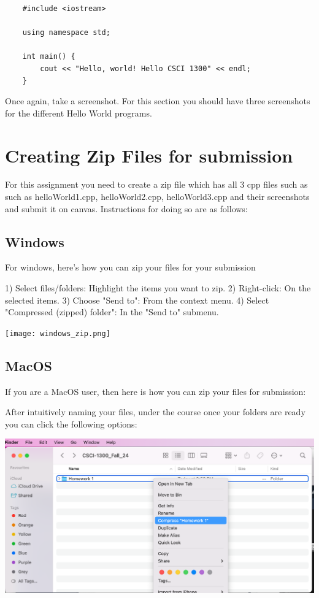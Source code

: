 \begin{verbatim}
    #include <iostream>

    using namespace std;
    
    int main() {
        cout << "Hello, world! Hello CSCI 1300" << endl;
    }
\end{verbatim}

Once again, take a screenshot. For this section you should have three screenshots for the different Hello World programs.

\section{Creating Zip Files for submission}

For this assignment you need to create a zip file which has all 3 cpp files such as  such as helloWorld1.cpp, helloWorld2.cpp, helloWorld3.cpp and their screenshots and submit it on canvas. Instructions for doing so are as follows:

\subsection{Windows}

For windows, here's how you can zip your files for your submission 

1) Select files/folders: Highlight the items you want to zip.
2) Right-click: On the selected items.
3) Choose "Send to": From the context menu.
4) Select "Compressed (zipped) folder": In the "Send to" submenu.

\texttt{[image: windows\_zip.png]}

\subsection{MacOS}

If you are a MacOS user, then here is how you can zip your files for submission:

After intuitively naming your files, under the course once your folders are ready you can click the following options:

\includegraphics[width=\textwidth]{images/macos_zipfile.png}

